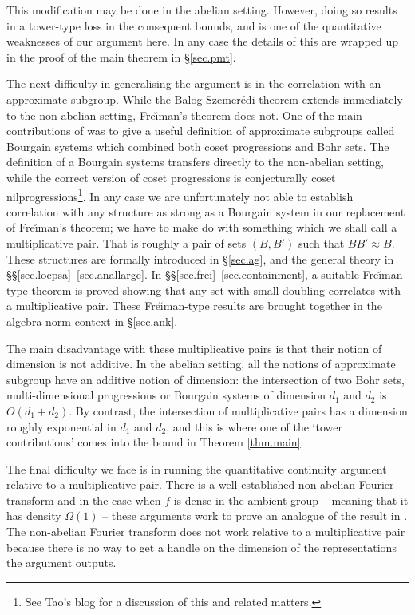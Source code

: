 \documentclass[12pt]{amsart}
\numberwithin{equation}{section}
\theoremstyle{plain}
\theoremstyle{definition}
\begin{document}
This modification may be done in the abelian setting.  However, doing so results in a tower-type loss in the consequent bounds, and is one of the quantitative weaknesses of our argument here.  In any case the details of this are wrapped up in the proof of the main theorem in \S\ref{sec.pmt}.

The next difficulty in generalising the argument is in the correlation with an approximate subgroup.  While the Balog-Szemer{\'e}di theorem extends immediately to the non-abelian setting, Fre{\u\i}man's theorem does not.  One of the main contributions of \cite{BJGTS2} was to give a useful definition of approximate subgroups called Bourgain systems which combined both coset progressions and Bohr sets.  The definition of a Bourgain systems transfers directly to the non-abelian setting, while the correct version of coset progressions is conjecturally coset nilprogressions\footnote{See Tao's blog for a discussion of this and related matters.}.  In any case we are unfortunately not able to establish correlation with any structure as strong as a Bourgain system in our replacement of Fre{\u\i}man's theorem; we have to make do with something which we shall call a multiplicative pair.  That is roughly a pair of sets $(B,B')$ such that $BB' \approx B$.  These structures are formally introduced in \S\ref{sec.ag}, and the general theory in \S\S\ref{sec.locpsa}--\ref{sec.anallarge}.  In \S\S\ref{sec.frei}--\ref{sec.containment}, a suitable Fre{\u\i}man-type theorem is proved showing that any set with small doubling correlates with a multiplicative pair.  These Fre{\u\i}man-type results are brought together in the algebra norm context in \S\ref{sec.ank}.

The main disadvantage with these multiplicative pairs is that their notion of dimension is not additive.  In the abelian setting, all the notions of approximate subgroup have an additive notion of dimension: the intersection of two Bohr sets, multi-dimensional progressions or Bourgain systems of dimension $d_1$ and $d_2$ is $O(d_1+d_2)$.  By contrast, the intersection of multiplicative pairs has a dimension roughly exponential in $d_1$ and $d_2$,  and this is where one of the `tower contributions' comes into the bound in Theorem \ref{thm.main}.

The final difficulty we face is in running the quantitative continuity argument relative to a multiplicative pair. There is a well established non-abelian Fourier transform and in the case when $f$ is dense in the ambient group -- meaning that it has density $\Omega(1)$ -- these arguments work to prove an analogue of the result in \cite{BJGSVK}.   The non-abelian Fourier transform does not work relative to a multiplicative pair because there is no way to get a handle on the dimension of the representations the argument outputs. 
\end{document}
